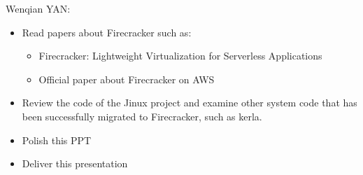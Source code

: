 \documentclass[conference]{IEEEtran}
\begin{document}
Wenqian YAN:\\
\begin{itemize}
	\item Read papers about Firecracker such as:\\
	\begin{itemize}
	\item Firecracker: Lightweight Virtualization for Serverless Applications
	\item Official paper about Firecracker on AWS
	\end{itemize}
	\item Review the code of the Jinux project and examine other system code that has been successfully migrated to Firecracker, such as kerla.
	\item Polish this PPT
	\item Deliver this presentation
\end{itemize}

\vspace{12pt}
\end{document}
